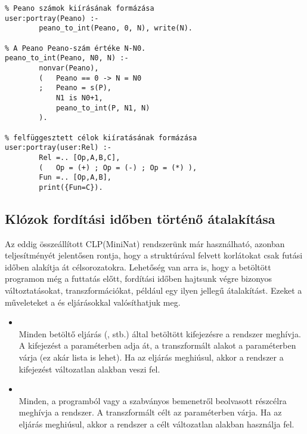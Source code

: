 \begin{verbatim}
% Peano számok kiírásának formázása
user:portray(Peano) :-
        peano_to_int(Peano, 0, N), write(N).

% A Peano Peano-szám értéke N-N0.
peano_to_int(Peano, N0, N) :-
        nonvar(Peano),
        (   Peano == 0 -> N = N0
        ;   Peano = s(P), 
            N1 is N0+1,
            peano_to_int(P, N1, N)
        ).

% felfüggesztett célok kiíratásának formázása
user:portray(user:Rel) :-
        Rel =.. [Op,A,B,C],
        (   Op = (+) ; Op = (-) ; Op = (*) ),
        Fun =.. [Op,A,B],
        print({Fun=C}).
\end{verbatim}

\subsection{Klózok fordítási időben történő átalakítása}

Az eddig összeállított CLP(MiniNat) rendszerünk már használható, azonban
teljesítményét jelentősen rontja, hogy a  struktúrával felvett
korlátokat csak futási időben alakítja át célsorozatokra. Lehetőség van
arra is, hogy a betöltött programon még a futtatás előtt, fordítási időben
hajtsunk végre bizonyos változtatásokat, transzformációkat, például egy
ilyen jellegű átalakítást. Ezeket a műveleteket a  és
 eljárásokkal valósíthatjuk meg.

\begin{itemize}
\item {} \\
      Minden betöltő eljárás (,  stb.) által
      betöltött kifejezésre a rendszer meghívja. A kifejezést a 
      paraméterben adja át, a transzformált alakot a  paraméterben
      várja (ez akár lista is lehet). Ha az eljárás meghiúsul, akkor a rendszer
      a kifejezést változatlan alakban veszi fel.

\item {} \\
      Minden, a programból vagy a szabványos bemenetről beolvasott részcélra
      meghívja a rendszer. A transzformált célt az  paraméterben
      várja. Ha az eljárás meghiúsul, akkor a rendszer a célt változatlan
      alakban használja fel.
\end{itemize}

